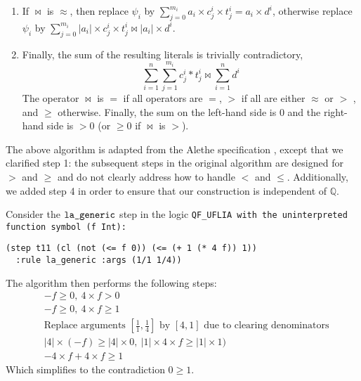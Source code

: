 \begin{enumerate}
    \item If $\bowtie$ is $\approx$, then replace $\psi_i$ by
    $\sum_{j=0}^{m_i}a_i\times{}c_j^i\times{}t_j^i = a_i\times{}d^i$, otherwise replace $\psi_i$ by
    $\sum_{j=0}^{m_i}|a_i|\times{}c_j^i\times{}t_j^i \bowtie |a_i|\times{}d^i$.

    \item Finally, the sum of the resulting literals is trivially contradictory,
    \[
        \sum_{i=1}^{n}\sum_{j=1}^{m_i} c_j^i*t_j^i \bowtie \sum_{i=1}^{n}d^i
    \]
  The operator $\bowtie$ is $=$ if all operators are $=$, $>$ if all are either $\approx$ or $>$ , and $\geq$ otherwise. Finally, the sum on the left-hand side is $0$ and the right-hand side is $>0$ (or $\geq 0$ if $\bowtie$ is $>$).

\end{enumerate}

The above algorithm is adapted from the Alethe specification \cite{alethespec}, except that we clarified step 1: the subsequent steps in the original algorithm are designed for $>$ and $\geq$ and do not clearly address how to handle $<$ and $\leq$.
Additionally, we added step 4 in order to ensure that our construction is independent of $\mathbb{Q}$.

\begin{example}
Consider the $\tt{la\_generic}$ step in the logic \tt{QF\_UFLIA} with the uninterpreted function symbol \lstinline[language=SMT,basicstyle=\ttfamily\upshape]|(f Int)|:
\begin{lstlisting}[language=SMT,label={lst:lageneric-example}]
(step t11 (cl (not (<= f 0)) (<= (+ 1 (* 4 f)) 1))
  :rule la_generic :args (1/1 1/4))
\end{lstlisting} 
%
The algorithm then performs the following steps:
\begin{align}
&- f \geq 0,~ 4 \times f > 0 \label{eq:step2}\tag{Steps 1 and 2}\\
&- f \geq 0,~ 4 \times f \geq 1 \label{eq:step3}\tag{Step 3}\\
&\text{Replace arguments } [\frac{1}{1}, \frac{1}{4}] \text{ by } [4, 1] \text{ due to clearing denominators} \label{eq:step4}\tag{Step 4}\\
&|4| \times (- f) \geq |4| \times 0, ~ |1| \times 4 \times f \geq |1| \times 1) \label{eq:step5}\tag{Step 5} \\
&-4 \times f + 4 \times f \geq 1 \label{eq:step6}\tag{Step 6}
\end{align}
Which simplifies to the contradiction  $0 \geq 1$.
\label{ex:la_generic_example_red}
\end{example}

